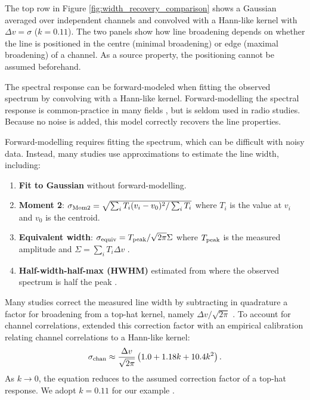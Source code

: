 \documentclass{rnaastex}
\begin{document}
The top row in Figure \ref{fig:width_recovery_comparison} shows a Gaussian averaged over independent channels and convolved with a Hann-like kernel with $\Delta v=\sigma$ ($k=0.11$).  The two panels show how line broadening depends on whether the line is positioned in the centre (minimal broadening) or edge (maximal broadening) of a channel.  As a source property, the positioning cannot be assumed beforehand.

The spectral response can be forward-modeled when fitting the observed spectrum by convolving with a Hann-like kernel.  Forward-modelling the spectral response is common-practice in many fields \citep[e.g.,][]{martin2015}, but is seldom used in radio studies.  Because no noise is added, this model correctly recovers the line properties.

Forward-modelling requires fitting the spectrum, which can be difficult with noisy data. Instead, many studies use approximations to estimate the line width, including:
\begin{enumerate}
    \item {\bf Fit to Gaussian} without forward-modelling.
    \item {\bf Moment 2}: $\sigma_{\rm Mom2}=\sqrt{\sum_i T_i (v_i - v_0)^2 / \sum_i T_i}$ where $T_i$ is the value at $v_i$ and $v_0$ is the centroid.
    \item {\bf Equivalent width}: $\sigma_{\rm equiv} = T_{\rm peak} / \sqrt{2\pi} \Sigma$ where $T_{\rm peak}$ is the measured amplitude and $\Sigma= \sum_i T_i \Delta v$ \citep{heyer2001,leroy2016,sun2018}.
    \item {\bf Half-width-half-max (HWHM)} estimated from where the observed spectrum is half the peak \citep{stilp2013a,stilp2013b,koch2018}.
\end{enumerate}

Many studies correct the measured line width by subtracting in quadrature a factor for broadening from a top-hat kernel, namely $\Delta v / \sqrt{2\pi}$ \citep{cprops}.  To account for channel correlations, \citet{leroy2016} extended this correction factor with an empirical calibration relating channel correlations to a Hann-like kernel:
\begin{equation}
    \label{eq:leroy16_corrfact}
    \sigma_{\rm chan} \approx \frac{\Delta v}{\sqrt{2\pi}} \left( 1.0 + 1.18k + 10.4k^2 \right).
\end{equation}
As $k\rightarrow0$, the equation reduces to the assumed correction factor of a top-hat response.  We adopt $k=0.11$ for our example \citep{sun2018}.
\end{document}
